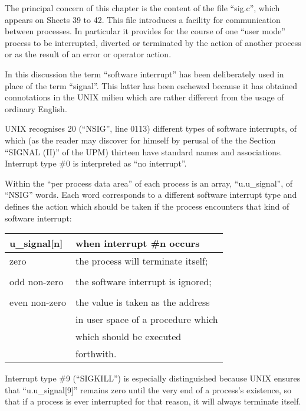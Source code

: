 %
%

The principal concern of this chapter
is the content of the file ``sig.c'',
which appears on Sheets 39 to 42. This
file introduces a facility for communication between processes. In particular
it provides for the course of one ``user
mode'' process to be interrupted,
diverted or terminated by the action of
another process or as the result of an
error or operator action.

In this discussion the term ``software
interrupt'' has been deliberately used
in place of the term ``signal''. This
latter has been eschewed because it has
obtained connotations in the UNIX
milieu which are rather different from
the usage of ordinary English.

UNIX recognises 20 (``NSIG'', line 0113)
different types of software interrupts,
of which (as the reader may discover
for himself by perusal of the the Section ``SIGNAL (II)'' of the UPM)
thirteen
have standard names and associations.
Interrupt type \#0 is interpreted as ``no
interrupt''.

Within the ``per process data area'' of
each process is an array, ``u.u\_signal'',
of ``NSIG'' words. Each word corresponds
to a different software interrupt type
and defines the action which should be
taken if the process encounters that
kind of software interrupt:

\begin{center}
\begin{tabular}{ll}
u\_signal[n] & when interrupt \#n occurs\\ \hline
zero & the process will terminate itself; \\
\\
odd non-zero & the software interrupt is ignored;\\
\\
even non-zero & the value is taken as the address\\
              & in user space of a procedure which\\
	      & which should be executed\\
	      & forthwith.\\
\end{tabular}
\end{center}

Interrupt type \#9 (``SIGKILL'') is especially distinguished
because UNIX ensures that ``u.u\_signal[9]'' remains
zero until the very end of a process's
existence, so that if a process is ever
interrupted for that reason, it will
always terminate itself.


